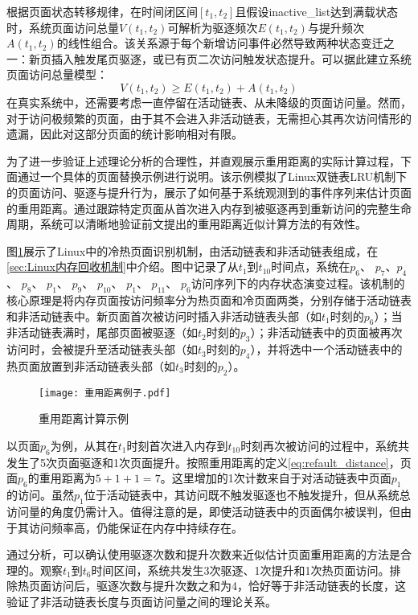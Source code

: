 根据页面状态转移规律，在时间闭区间$[t_1, t_2]$且假设inactive\_list达到满载状态时，系统页面访问总量$V(t_1, t_2)$可解析为驱逐频次$E(t_1, t_2)$与提升频次$A(t_1, t_2)$的线性组合。该关系源于每个新增访问事件必然导致两种状态变迁之一：新页插入触发尾页驱逐，或已有页二次访问触发状态提升。可以据此建立系统页面访问总量模型：
\begin{equation}
  V(t_1, t_2) \geq E(t_1,t_2) + A(t_1,t_2)
\end{equation}
在真实系统中，还需要考虑一直停留在活动链表、从未降级的页面访问量。然而，对于访问极频繁的页面，由于其不会进入非活动链表，无需担心其再次访问情形的遗漏，因此对这部分页面的统计影响相对有限。

为了进一步验证上述理论分析的合理性，并直观展示重用距离的实际计算过程，下面通过一个具体的页面替换示例进行说明。该示例模拟了Linux双链表LRU机制下的页面访问、驱逐与提升行为，展示了如何基于系统观测到的事件序列来估计页面的重用距离。通过跟踪特定页面从首次进入内存到被驱逐再到重新访问的完整生命周期，系统可以清晰地验证前文提出的重用距离近似计算方法的有效性。

图\ref{fig:page_replacement_example}展示了Linux中的冷热页面识别机制，由活动链表和非活动链表组成，在\ref{sec:Linux内存回收机制}中介绍。图中记录了从$t_1$到$t_{10}$时间点，系统在\(p_6\)、 \(p_7\)、\(p_4\)、 \(p_8\)、 \(p_1\)、 \(p_9\)、 \(p_{10}\)、 \(p_1\)、 \(p_{11}\)、 \(p_6\)访问序列下的内存状态演变过程。该机制的核心原理是将内存页面按访问频率分为热页面和冷页面两类，分别存储于活动链表和非活动链表中。新页面首次被访问时插入非活动链表头部（如$t_1$时刻的\(p_6\)）；当非活动链表满时，尾部页面被驱逐（如\(t_2\)时刻的$p_3$）；非活动链表中的页面被再次访问时，会被提升至活动链表头部（如$t_3$时刻的$p_4$），并将选中一个活动链表中的热页面放置到非活动链表头部（如$t_3$时刻的$p_2$）。
\begin{figure}[H]
  \centering
  \texttt{[image: 重用距离例子.pdf]}
  \caption{重用距离计算示例}
  \label{fig:page_replacement_example}
\end{figure}




以页面$p_6$为例，从其在$t_1$时刻首次进入内存到$t_{10}$时刻再次被访问的过程中，系统共发生了5次页面驱逐和1次页面提升。按照重用距离的定义\ref{eq:refault_distance}，页面$p_6$的重用距离为$5+1+1=7$。这里增加的1次计数来自于对活动链表中页面$p_1$的访问。虽然$p_1$位于活动链表中，其访问既不触发驱逐也不触发提升，但从系统总访问量的角度仍需计入。值得注意的是，即使活动链表中的页面偶尔被误判，但由于其访问频率高，仍能保证在内存中持续存在。

通过分析，可以确认使用驱逐次数和提升次数来近似估计页面重用距离的方法是合理的。观察$t_1$到$t_6$时间区间，系统共发生3次驱逐、1次提升和1次热页面访问。排除热页面访问后，驱逐次数与提升次数之和为4，恰好等于非活动链表的长度，这验证了非活动链表长度与页面访问量之间的理论关系。

